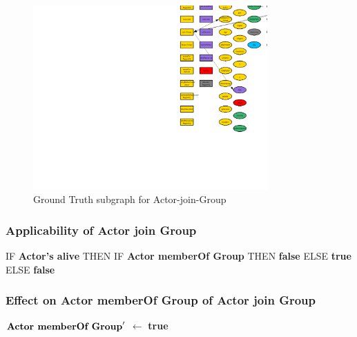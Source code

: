 \documentclass{article}%
\begin{document}
\begin{figure}[ht]%
\centering%
\includegraphics[width=0.8\textwidth]{images/Actor-join-Group.png}%
\caption{Ground Truth subgraph for Actor{-}join{-}Group}%
\end{figure}

%
\subsubsection{Applicability of Actor join Group}%
\label{ssubsec:Applicability of Actor join Group}%
\begin{flushleft}%
IF %
\textbf{Actor's alive}%
\linebreak%
\hspace*{2em}%
THEN %
IF %
\textbf{Actor memberOf Group}%
\linebreak%
\hspace*{4em}%
THEN %
\textbf{false}%
\linebreak%
\hspace*{4em}%
ELSE %
\textbf{true}%
\linebreak%
\hspace*{2em}%
ELSE %
\textbf{false}%
\end{flushleft}

%
\subsubsection{Effect on Actor memberOf Group of Actor join Group}%
\label{ssubsec:Effect on Actor memberOf Group of Actor join Group}%
\begin{flushleft}%
$\mbox{\textbf{Actor memberOf Group}} '$%
$\leftarrow$%
\textbf{true}%
\end{flushleft}

%
\end{document}
